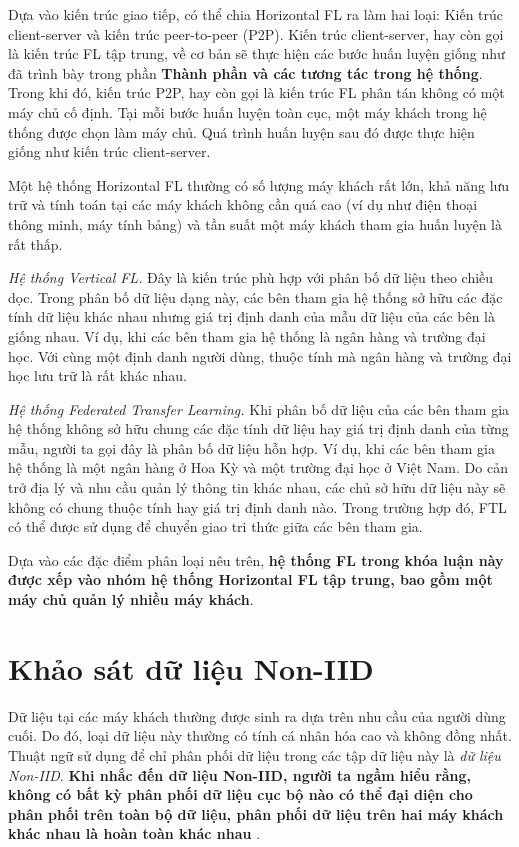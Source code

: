 Dựa vào kiến trúc giao tiếp, có thể chia Horizontal FL ra làm hai loại: Kiến trúc client-server và kiến trúc peer-to-peer (P2P). Kiến trúc client-server, hay còn gọi là kiến trúc FL tập trung, về cơ bản sẽ thực hiện các bước huấn luyện giống như đã trình bày trong phần \textbf{Thành phần và các tương tác trong hệ thống}. Trong khi đó, kiến trúc P2P, hay còn gọi là kiến trúc FL phân tán không có một máy chủ cố định. Tại mỗi bước huấn luyện toàn cục, một máy khách trong hệ thống được chọn làm máy chủ. Quá trình huấn luyện sau đó được thực hiện giống như kiến trúc client-server.

Một hệ thống Horizontal FL thường có số lượng máy khách rất lớn, khả năng lưu trữ và tính toán tại các máy khách không cần quá cao (ví dụ như điện thoại thông minh, máy tính bảng) và tần suất một máy khách tham gia huấn luyện là rất thấp.

\textit{Hệ thống Vertical FL.} Đây là kiến trúc phù hợp với phân bố dữ liệu theo chiều dọc. Trong phân bố dữ liệu dạng này, các bên tham gia hệ thống sở hữu các đặc tính dữ liệu khác nhau nhưng giá trị định danh của mẫu dữ liệu của các bên là giống nhau. Ví dụ, khi các bên tham gia hệ thống là ngân hàng và trường đại học. Với cùng một định danh người dùng, thuộc tính mà ngân hàng và trường đại học lưu trữ là rất khác nhau.

\textit{Hệ thống Federated Transfer Learning.} Khi phân bố dữ liệu của các bên tham gia hệ thống không sở hữu chung các đặc tính dữ liệu hay giá trị định danh của từng mẫu, người ta gọi đây là phân bố dữ liệu hỗn hợp. Ví dụ, khi các bên tham gia hệ thống là một ngân hàng ở Hoa Kỳ và một trường đại học ở Việt Nam. Do cản trở địa lý và nhu cầu quản lý thông tin khác nhau, các chủ sở hữu dữ liệu này sẽ không có chung thuộc tính hay giá trị định danh nào. Trong trường hợp đó, FTL có thể được sử dụng để chuyển giao tri thức giữa các bên tham gia.

Dựa vào các đặc điểm phân loại nêu trên, \textbf{hệ thống FL trong khóa luận này được xếp vào nhóm hệ thống Horizontal FL tập trung, bao gồm một máy chủ quản lý nhiều máy khách}.

\section{Khảo sát dữ liệu Non-IID}

Dữ liệu tại các máy khách thường được sinh ra dựa trên nhu cầu của người dùng cuối. Do đó, loại dữ liệu này thường có tính cá nhân hóa cao và không đồng nhất. Thuật ngữ sử dụng để chỉ phân phối dữ liệu trong các tập dữ liệu này là \textit{dữ liệu Non-IID}. \textbf{Khi nhắc đến dữ liệu Non-IID, người ta ngầm hiểu rằng, không có bất kỳ phân phối dữ liệu cục bộ nào có thể đại diện cho phân phối trên toàn bộ dữ liệu, phân phối dữ liệu trên hai máy khách khác nhau là hoàn toàn khác nhau} \cite{zhu2021federated}.

